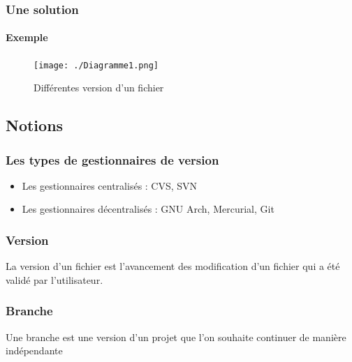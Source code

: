 \begin{frame}
 \frametitle{Une solution}
 \framesubtitle{Exemple}
\begin{figure}
 \centering
 \texttt{[image: ./Diagramme1.png]}
 \caption{Différentes version d'un fichier}
\end{figure}
\end{frame}



\subsection{Notions}
\begin{frame}
\frametitle{Les types de gestionnaires de version}
\begin{itemize}
 \item Les gestionnaires centralisés : CVS, SVN
 \item Les gestionnaires décentralisés : GNU Arch, Mercurial, Git
\end{itemize}
\end{frame}


\begin{frame}
\frametitle{Version}
La version d'un fichier est l'avancement des modification d'un fichier qui a été validé par l'utilisateur.
\end{frame}

\begin{frame}
\frametitle{Branche}
Une branche est une version d'un projet que l'on souhaite continuer de manière indépendante 
\end{frame}